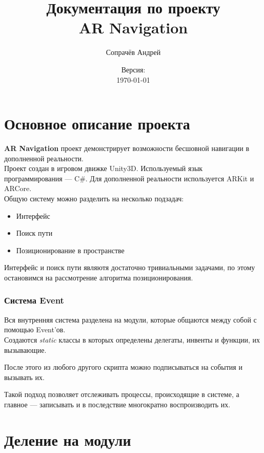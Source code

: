 \documentclass[a4paper, 11pt, titlepage]{article}
\title{Документация по проекту \\ \textbf{AR Navigation}}
\author{Сопрачёв Андрей}
\date{Версия: \versionnumber \\ \today}
\begin{document}
\sffamily
\maketitle

\tableofcontents
\newpage

\part{Основное описание проекта}
  \textbf{AR Navigation} проект демонстрирует возможности бесшовной навигации в дополненной реальности. \\
  Проект создан в игровом движке Unity3D. Используемый язык программирования --- C\#. Для дополненной реальности используется ARKit и ARCore.\\
  Общую систему можно разделить на несколько подзадач:
  \begin{itemize}
    \item Интерфейс
    \item Поиск пути
    \item Позиционирование в пространстве
  \end{itemize}
  Интерфейс и поиск пути являютя достаточно тривиальными задачами, по этому остановимся на рассмотрение алгоритма 
  позиционирования.

  \section{Система Event}
  Вся внутренняя система разделена на модули, которые общаются между собой с помощью Event'ов.\\
  Создаются \textit{static} классы в которых определены делегаты, инвенты и функции, их вызывающие.

  \lstset{style=sharpc}
  
  После этого из любого другого скрипта можно подписываться на события и вызывать их.
  
  Такой подход позволяет отслеживать процессы, происходящие в системе, а главное --- записывать и в последствие многократно воспроизводить их.

\part{Деление на модули}
\end{document}
